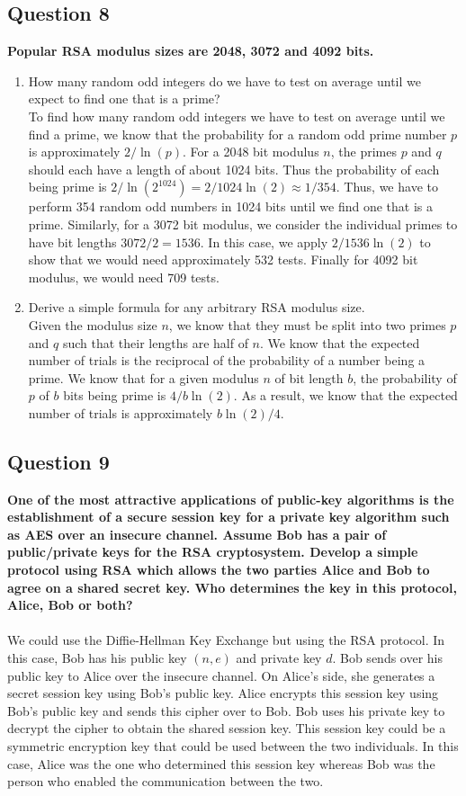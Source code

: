 \documentclass[titlepage]{article}
\begin{document}
{\subsection{Question 8}
{
\textbf{Popular RSA modulus sizes are 2048, 3072 and 4092 bits.}
\begin{enumerate}
    \item How many random odd integers do we have to test on average until we expect to find one that is a prime?\\To find how many random odd integers we have to test on average until we find a prime, we know that the probability for a random odd prime number \(p\) is approximately \(2 / \ln (p)\). For a 2048 bit modulus \(n\), the primes \(p\) and \(q\) should each have a length of about 1024 bits. Thus the probability of each being prime is \(2 / \ln(2^{1024}) = 2 / 1024\ln(2) \approx 1/354\). Thus, we have to perform 354 random odd numbers in 1024 bits until we find one that is a prime. Similarly, for a 3072 bit modulus, we consider the individual primes to have bit lengths \(3072 / 2 = 1536\). In this case, we apply \(2 / 1536\ln(2)\) to show that we would need approximately 532 tests. Finally for 4092 bit modulus, we would need 709 tests.
    \item Derive a simple formula for any arbitrary RSA modulus size.\\Given the modulus size \(n\), we know that they must be split into two primes \(p\) and \(q\) such that their lengths are half of \(n\). We know that the expected number of trials is the reciprocal of the probability of a number being a prime. We know that for a given modulus \(n\) of bit length \(b\), the probability of \(p\) of \(b\) bits being prime is \(4 / b\ln(2)\). As a result, we know that the expected number of trials is approximately \(b\ln(2) / 4\). 
\end{enumerate}
}
\clearpage
\subsection{Question 9}
{
\textbf{One of the most attractive applications of public-key algorithms is the establishment of a secure session key for a private key algorithm such as AES over an insecure channel. Assume Bob has a pair of public/private keys for the RSA cryptosystem. Develop a simple protocol using RSA which allows the two parties Alice and Bob to agree on a shared secret key. Who determines the key in this protocol, Alice, Bob or both?}\\\\
We could use the Diffie-Hellman Key Exchange but using the RSA protocol. In this case, Bob has his public key \((n, e)\) and private key \(d\). Bob sends over his public key to Alice over the insecure channel. On Alice's side, she generates a secret session key using Bob's public key. Alice encrypts this session key using Bob's public key and sends this cipher over to Bob. Bob uses his private key to decrypt the cipher to obtain the shared session key. This session key could be a symmetric encryption key that could be used between the two individuals. In this case, Alice was the one who determined this session key whereas Bob was the person who enabled the communication between the two.
}
}
\end{document}
